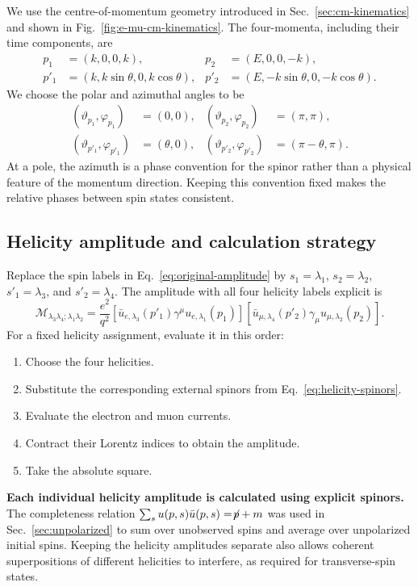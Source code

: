 \documentclass[12pt,a4paper]{article}
\numberwithin{equation}{section}
\newcommand{\M}{\mathcal M}
\newcommand{\slsh}[1]{\not\!#1}
\begin{document}
We use the centre-of-momentum geometry introduced in
Sec.~\ref{sec:cm-kinematics} and shown in Fig.~\ref{fig:e-mu-cm-kinematics}.
The four-momenta, including their time components, are
\begin{align}
 p_1&=(k,0,0,k),&p_2&=(E,0,0,-k),\\
 p'_1&=(k,k\sin\theta,0,k\cos\theta),&
 p'_2&=(E,-k\sin\theta,0,-k\cos\theta).
\end{align}
We choose the polar and azimuthal angles to be
\begin{align}
 (\vartheta_{p_1},\varphi_{p_1})&=(0,0),&
 (\vartheta_{p_2},\varphi_{p_2})&=(\pi,\pi),\\
 (\vartheta_{p'_1},\varphi_{p'_1})&=(\theta,0),&
 (\vartheta_{p'_2},\varphi_{p'_2})&=(\pi-\theta,\pi).
 \label{eq:angles}
\end{align}
At a pole, the azimuth is a phase convention for the spinor rather than a
physical feature of the momentum direction. Keeping this convention fixed
makes the relative phases between spin states consistent.

\subsection{Helicity amplitude and calculation strategy}
Replace the spin labels in Eq.~\eqref{eq:original-amplitude} by
$s_1=\lambda_1$, $s_2=\lambda_2$, $s'_1=\lambda_3$, and
$s'_2=\lambda_4$. The amplitude with all four helicity labels explicit is
\begin{equation}
 \boxed{\M_{\lambda_3\lambda_4;\lambda_1\lambda_2}
 =\frac{e^2}{q^2}
 [\bar u_{e,\lambda_3}(p'_1)\gamma^\mu u_{e,\lambda_1}(p_1)]
 [\bar u_{\mu,\lambda_4}(p'_2)\gamma_\mu u_{\mu,\lambda_2}(p_2)] .}
 \label{eq:helicity-amplitude}
\end{equation}
For a fixed helicity assignment, evaluate it in this order:
\begin{enumerate}
 \item Choose the four helicities.
 \item Substitute the corresponding external spinors from
       Eq.~\eqref{eq:helicity-spinors}.
 \item Evaluate the electron and muon currents.
 \item Contract their Lorentz indices to obtain the amplitude.
 \item Take the absolute square.
\end{enumerate}
\textbf{Each individual helicity amplitude is calculated using explicit spinors.} The completeness relation $\sum_s u(p,s)\bar u(p,s)=\slsh p+m$ was used in Sec.~\ref{sec:unpolarized} to sum over unobserved spins and average over unpolarized initial spins. Keeping the helicity amplitudes
separate also allows coherent superpositions of different helicities to
interfere, as required for transverse-spin states.
\end{document}
